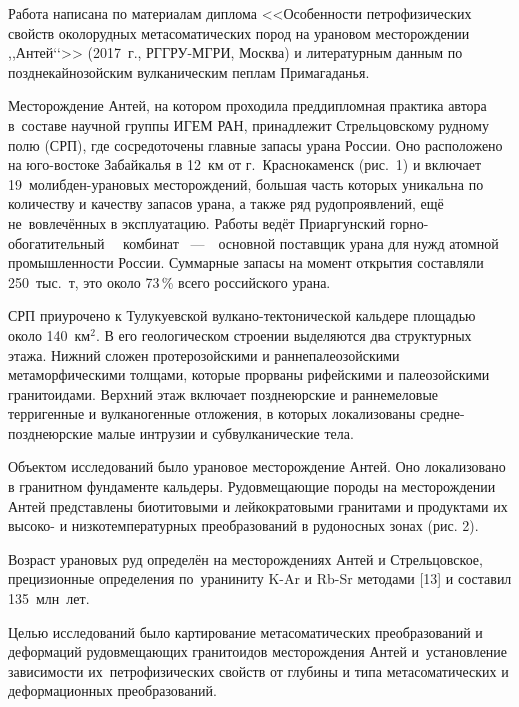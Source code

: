  

\makeProcTitle
{}

Работа написана по материалам диплома <<Особенности петрофизических свойств околорудных метасоматических пород на урановом месторождении ,,Антей‘‘>> (2017~г., РГГРУ-МГРИ, Москва) и литературным данным по позднекайнозойским вулканическим пеплам Примагаданья.



Месторождение Антей, на котором проходила преддипломная практика автора в~составе научной группы ИГЕМ РАН, принадлежит Стрельцовскому рудному полю (СРП), где сосредоточены главные запасы урана России. Оно расположено на юго-востоке Забайкалья в 12~км от г.~Краснокаменск (рис.~1) и включает 19~молибден-урановых месторождений, большая часть которых уникальна по количеству и качеству запасов урана, а также ряд рудопроявлений, ещё не~вовлечённых в эксплуатацию. Работы ведёт Приаргунский горно-обогатительный\,\,\,\,\,\, комбинат\,\,~--- \,\,\,\,основной поставщик урана для нужд атомной промышленности России. Суммарные запасы на момент открытия составляли 250~тыс.~т, это около 73\,\% всего российского урана.

СРП приурочено к Тулукуевской вулкано-тектонической кальдере площадью около 140~км$^2$. В его геологическом строении выделяются два структурных этажа. Нижний сложен протерозойскими и раннепалеозойскими метаморфическими толщами, которые прорваны рифейскими и палеозойскими гранито\-идами. Верхний этаж включает позднеюрские и раннемеловые терригенные и вулканогенные отложения, в которых локализованы средне-позднеюрские малые интрузии и субвулканические тела.

Объектом исследований было урановое месторождение Антей. Оно локализовано в гранитном фундаменте кальдеры. Рудовмещающие породы на месторождении Антей представлены биотитовыми и лейкократовыми гранитами и продуктами их высоко- и низкотемпературных преобразований в рудоносных зонах (рис. 2).

Возраст урановых руд определён на месторождениях Антей и Стрельцовское, прецизионные определения по~ураниниту K-Ar и Rb-Sr методами [13] и составил 135~млн~лет.



Целью исследований было картирование метасоматических преобразований и деформаций рудовмещающих гранитоидов месторождения Антей и~установление зависимости их~петрофизических свойств от глубины и типа метасоматических и деформационных преобразований.

